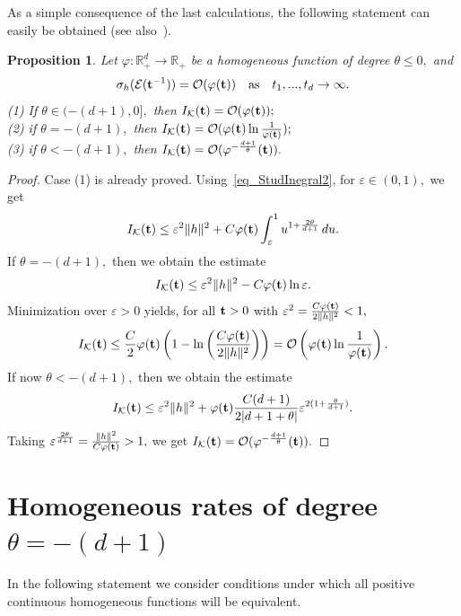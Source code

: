 \documentclass[12pt]{article}
\newtheorem{proposition}{Proposition}
\begin{document}
As a simple consequence of the last calculations, the following statement can easily be obtained (see also~\cite[\S 3.1]{KPTKh24}).

\begin{proposition}\label{Propos_Estimates}
	Let ${\varphi:\mathbb{R}^d_+\to\mathbb{R}_+}$ be a homogeneous function of degree ${\theta\leq0},$ and 
	$$
	{\sigma_{h}(\mathcal{E}({\bf t}^{-1}))=\mathcal{O}(\varphi({\bf t}))}\ \ \ \text{as} \ \ \ {t_1,...,t_d\to\infty}.
	$$ 
	(1) If ${\theta\in(-(d+1),0]},$ then $I_{\mathcal{K}}({\bf t})=\mathcal{O}(\varphi({\bf t}));$
	\\
	(2) if ${\theta=-(d+1)},$ then $I_{\mathcal{K}}({\bf t})=\mathcal{O}(\varphi({\bf t})\ln\frac{1}{\varphi({\bf t})});$
	\\
	(3) if ${\theta<-(d+1)},$ then $I_{\mathcal{K}}({\bf t})=\mathcal{O}(\varphi^{-\frac{d+1}{\theta}}({\bf t})).$
\end{proposition}

\begin{proof} Case (1) is already proved.
Using~\eqref{eq_StudInegral2}, for ${\varepsilon\in(0,1)},$ we get
$$
I_{\mathcal{K}}({\bf t})\leq\varepsilon^2\|h\|^2+C\varphi({\bf t})\int_\varepsilon^1u^{1+\frac{2\theta}{d+1}}\,du.
$$
If ${\theta=-(d+1)},$ then we obtain the estimate
$$
I_{\mathcal{K}}({\bf t})\leq\varepsilon^2\|h\|^2-C\varphi({\bf t})\ln\varepsilon.
$$
Minimization over ${\varepsilon>0}$ yields, for all ${\bf t}>0$ with ${\varepsilon^2=\frac{C\varphi(\bf{t})}{2\|h\|^2}<1},$
$$
I_{\mathcal{K}}({\bf t})\leq\frac{C}{2}\varphi({\bf t})\left(1-\ln\left(\frac{C\varphi(\bf{t})}{2\|h\|^2}\right)\right)=\mathcal{O}\left(\varphi({\bf t})\ln\frac{1}{\varphi({\bf t})}\right).
$$
If now ${\theta<-(d+1)},$ then we obtain the estimate
$$
I_{\mathcal{K}}({\bf t})\leq\varepsilon^2\|h\|^2+\varphi({\bf t})\frac{C(d+1)}{2|d+1+\theta|}\varepsilon^{2(1+\frac{\theta}{d+1})}.
$$
Taking ${\varepsilon^{\frac{2\theta}{d+1}}=\frac{\|h\|^2}{C\varphi({\bf t})}}>1,$ we get
${I_{\mathcal{K}}({\bf t})=\mathcal{O}(\varphi^{-\frac{d+1}{\theta}}({\bf t}))}.$
\end{proof}

\section{Homogeneous rates of degree $\theta=-(d+1)$}

In the following statement we consider conditions under which 
all positive continuous homogeneous functions will be equivalent.
\end{document}
